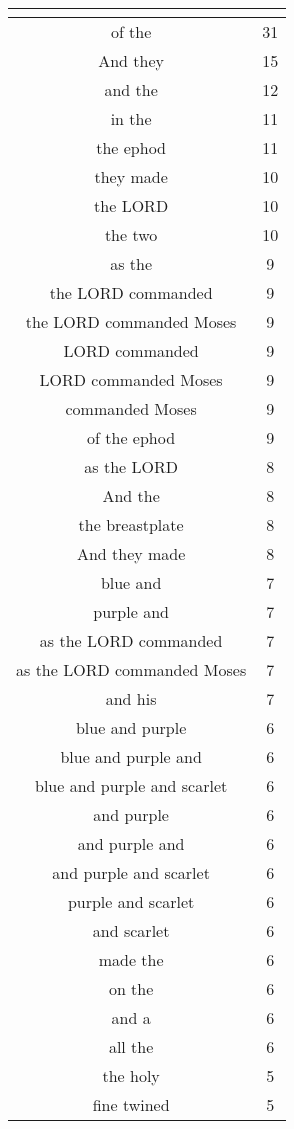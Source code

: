 \begin{center}
\begin{longtable}{|c|c|}
\hline \multicolumn{2}{c}{{ }} \\ \hline
\endfoot 
of the & 31\\ \hline 
And they & 15\\ \hline 
and the & 12\\ \hline 
in the & 11\\ \hline 
the ephod & 11\\ \hline 
they made & 10\\ \hline 
the LORD & 10\\ \hline 
the two & 10\\ \hline 
as the & 9\\ \hline 
the LORD commanded & 9\\ \hline 
the LORD commanded Moses & 9\\ \hline 
LORD commanded & 9\\ \hline 
LORD commanded Moses & 9\\ \hline 
commanded Moses & 9\\ \hline 
of the ephod & 9\\ \hline 
as the LORD & 8\\ \hline 
And the & 8\\ \hline 
the breastplate & 8\\ \hline 
And they made & 8\\ \hline 
blue and & 7\\ \hline 
purple and & 7\\ \hline 
as the LORD commanded & 7\\ \hline 
as the LORD commanded Moses & 7\\ \hline 
and his & 7\\ \hline 
blue and purple & 6\\ \hline 
blue and purple and & 6\\ \hline 
blue and purple and scarlet & 6\\ \hline 
and purple & 6\\ \hline 
and purple and & 6\\ \hline 
and purple and scarlet & 6\\ \hline 
purple and scarlet & 6\\ \hline 
and scarlet & 6\\ \hline 
made the & 6\\ \hline 
on the & 6\\ \hline 
and a & 6\\ \hline 
all the & 6\\ \hline 
the holy & 5\\ \hline 
fine twined & 5\\ \hline 

\end{longtable}
\end{center}
